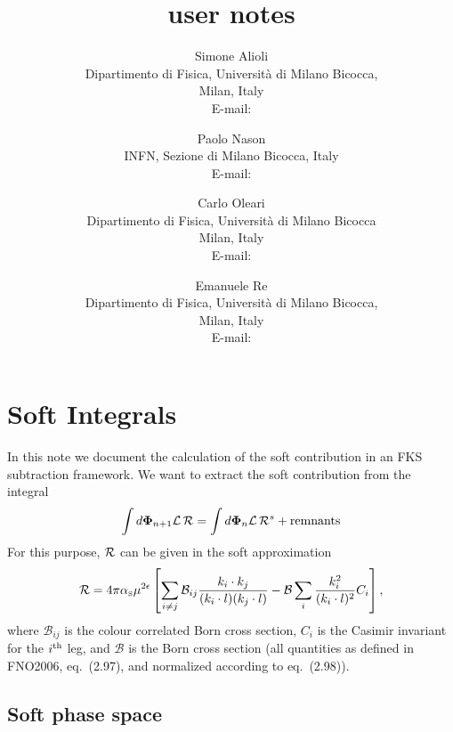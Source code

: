 \documentclass[paper]{JHEP3}
\title{\POWHEGBOX{} user notes }
\author{Simone Alioli \\
Dipartimento di Fisica, Universit\`a di Milano Bicocca,\\
Milan, Italy\\
E-mail: \email{Simone.Alioli@mib.infn.it}}
\author{Paolo Nason \\
INFN, Sezione di Milano Bicocca, Italy\\
E-mail: \email{Paolo.Nason@mib.infn.it}}
\author{Carlo Oleari \\
Dipartimento di Fisica, Universit\`a di Milano Bicocca\\
Milan, Italy\\
E-mail: \email{Carlo.Oleari@mib.infn.it}}
\author{Emanuele Re \\
Dipartimento di Fisica, Universit\`a di Milano Bicocca,\\
Milan, Italy\\
E-mail: \email{Emanuele.Re@mib.infn.it}}
\newcommand\sss{\mathchoice%
{\displaystyle}%
{\scriptstyle}%
{\scriptscriptstyle}%
{\scriptscriptstyle}%
}
\newcommand\Lum{{\cal L}}
\newcommand\matR{{\cal R}}
\newcommand\Kinnpo{{\bf \Phi}_{n+1}}
\newcommand\Kinn{{\bf \Phi}_n}
\newcommand\as{\alpha_{\sss\rm S}}
\begin{document}
\section{Soft Integrals}
In this note we document the calculation of the soft contribution in an FKS
subtraction framework. We want to extract the soft contribution from the
integral
\begin{equation}
  \int d \Kinnpo \Lum \,\matR = \int  d \Kinn \Lum\,\matR^s + {\rm remnants}
\end{equation}
For this purpose, $\matR$ can be given in the soft approximation
\begin{equation}
  \matR = 4 \pi \as \mu^{2 \epsilon}  \left[ \sum_{i \neq j}
  \mathcal{B}_{i 
  j} \frac{k_i \cdot k_j}{(k_i \cdot l) (k_j \cdot l)} - \mathcal{B} \sum_i
  \frac{k_i^2}{(k_i \cdot l)^2} C_i \right],
\end{equation}
where $\mathcal{B}_{i j}$ is the colour correlated Born cross section, $C_i$ is
the Casimir invariant for the $i^{\rm th}$ leg, and $\mathcal{B}$ is the
Born cross section (all quantities as defined in FNO2006, eq.~(2.97), and
normalized according to eq.~(2.98)).



\subsection{Soft phase space}
\end{document}
